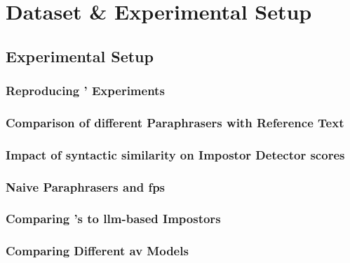 \chapter{Dataset \& Experimental Setup}
\label{chap:dataset_experimental_setup}




\section{Experimental Setup}
\label{sec:experimental_setup}

\subsection{Reproducing \citet{koppel_determining_2014}' Experiments}



\subsection{Comparison of different Paraphrasers with Reference Text}

\subsection{Impact of syntactic similarity on Impostor Detector scores}
\label{sec:syn_sim_impact_}

\subsection{Naive Paraphrasers and \acp{fp}}

\subsection{Comparing \citet{koppel_determining_2014}'s to \ac{llm}-based Impostors}

\subsection{Comparing Different \ac{av} Models}





